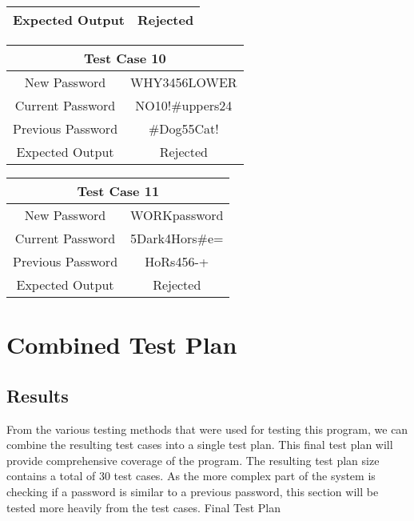 \documentclass[12pt,letterpaper]{article}
\begin{document}
\begin{center}
\begin{tabular}{||c|c||}
  \hline
  Expected Output & Rejected \\
  \hline
  \end{tabular}
  \vspace{1mm}
  \begin{tabular}{||c|c||}
  \hline
  \multicolumn{2}{||c||}{Test Case 10} \\
  \hline
  New Password & WHY3456LOWER \\
  \hline
  Current Password & NO10!\#uppers24 \\
  \hline
  Previous Password & \#Dog55Cat! \\
  \hline
  Expected Output & Rejected \\
  \hline
  \end{tabular}
  \begin{tabular}{||c|c||}
  \hline
  \multicolumn{2}{||c||}{Test Case 11} \\
  \hline
  New Password & WORKpassword \\
  \hline
  Current Password & 5Dark4Hors\#e= \\
  \hline
  Previous Password & HoRs456-+ \\
  \hline
  Expected Output & Rejected \\
  \hline
  \end{tabular}

\end{center}



\section{Combined Test Plan}

\subsection{Results}

From the various testing methods that were used for testing this program,
we can combine the resulting test cases into a single test plan. This final
test plan will provide comprehensive coverage of the program. The resulting test plan
size contains a total of 30 test cases. As the more complex part of the system is checking
if a password is similar to a previous password, this section will be tested more heavily
from the test cases.
\newline\newline
\centering Final Test Plan
\end{document}
